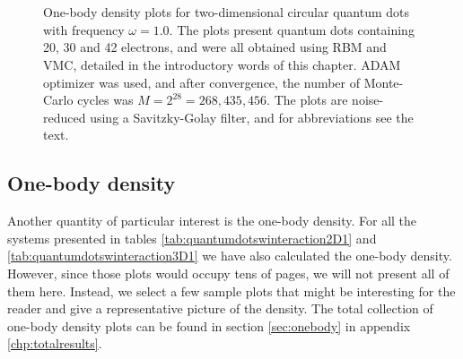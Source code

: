 \begin{figure}
	\centering
	\captionsetup[subfigure]{labelformat=empty}
	\hspace{0.1cm}
	\hspace{-0.0cm}
	\\
	
	\hspace{0.1cm}
	\hspace{-0.0cm}
	\\
	
	\hspace{0.1cm}
	\hspace{-0.0cm}
	
	\caption{One-body density plots for two-dimensional circular quantum dots with frequency $\omega=1.0$. The plots present quantum dots containing 20, 30 and 42 electrons, and were all obtained using RBM and VMC, detailed in the introductory words of this chapter. ADAM optimizer was used, and after convergence, the number of Monte-Carlo cycles was $M=2^{28}=268,435,456$. The plots are noise-reduced using a Savitzky-Golay filter, and for abbreviations see the text.}
	\label{fig:OB_interaction_1p0w2}
\end{figure}

\subsection{One-body density} \label{sec:onebodyresults}
Another quantity of particular interest is the one-body density. For all the systems presented in tables \eqref{tab:quantumdotswinteraction2D1} and \eqref{tab:quantumdotswinteraction3D1} we have also calculated the one-body density. However, since those plots would occupy tens of pages, we will not present all of them here. Instead, we select a few sample plots that might be interesting for the reader and give a representative picture of the density. The total collection of one-body density plots can be found in section \ref{sec:onebody} in appendix \ref{chp:totalresults}. 

